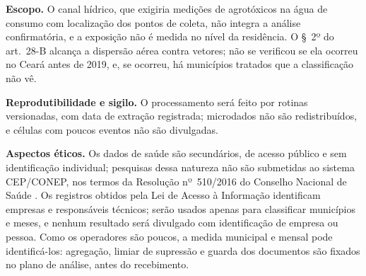 \textbf{Escopo.} O canal hídrico, que exigiria medições de agrotóxicos na
água de consumo com localização dos pontos de coleta, não integra a análise
confirmatória, e a exposição não é medida no nível da residência. O §~2º do
art.~28-B alcança a dispersão aérea contra vetores; não se verificou se ela
ocorreu no Ceará antes de 2019, e, se ocorreu, há municípios tratados que a
classificação não vê.

\textbf{Reprodutibilidade e sigilo.} O processamento será feito por rotinas
versionadas, com data de extração registrada; microdados não são
redistribuídos, e células com poucos eventos não são divulgadas.

\textbf{Aspectos éticos.} Os dados de saúde são secundários, de acesso público
e sem identificação individual; pesquisas dessa natureza não são submetidas ao
sistema CEP/CONEP, nos termos da Resolução nº~510/2016 do Conselho Nacional de
Saúde \cite{cns2016res510}. Os registros obtidos pela Lei de Acesso à
Informação identificam empresas e responsáveis técnicos; serão usados apenas
para classificar municípios e meses, e nenhum resultado será divulgado com
identificação de empresa ou pessoa. Como os operadores são poucos, a medida
municipal e mensal pode identificá-los: agregação, limiar de supressão e
guarda dos documentos são fixados no plano de análise, antes do recebimento.
